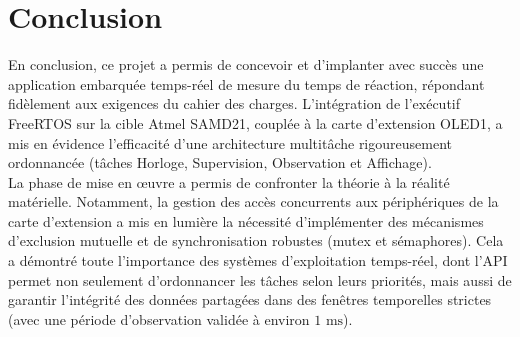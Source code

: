 \section{Conclusion}

En conclusion, ce projet a permis de concevoir et d'implanter avec succès une application embarquée temps-réel de mesure du temps de réaction, répondant fidèlement aux exigences du cahier des charges. L'intégration de l'exécutif FreeRTOS sur la cible Atmel SAMD21, couplée à la carte d'extension OLED1, a mis en évidence l'efficacité d'une architecture multitâche rigoureusement ordonnancée (tâches Horloge, Supervision, Observation et Affichage). \\

La phase de mise en œuvre a permis de confronter la théorie à la réalité matérielle. Notamment, la gestion des accès concurrents aux périphériques de la carte d'extension a mis en lumière la nécessité d'implémenter des mécanismes d'exclusion mutuelle et de synchronisation robustes (mutex et sémaphores). Cela a démontré toute l'importance des systèmes d'exploitation temps-réel, dont l'API permet non seulement d'ordonnancer les tâches selon leurs priorités, mais aussi de garantir l'intégrité des données partagées dans des fenêtres temporelles strictes (avec une période d'observation validée à environ $1\text{ ms}$).